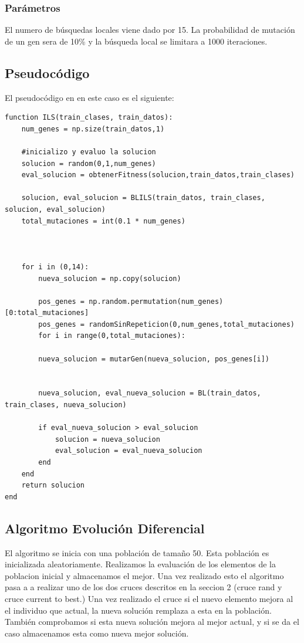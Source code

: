 \documentclass[titlepage]{article}
\begin{document}
	\subsubsection{Parámetros}
	El numero de búsquedas locales viene dado por 15. La probabilidad de mutación de un gen sera de 10\% y la búsqueda local se limitara a 1000 iteraciones.
	
	\subsection{Pseudocódigo}
	El pseudocódigo en en este caso es el siguiente:
	
	\begin{lstlisting}
function ILS(train_clases, train_datos):
	num_genes = np.size(train_datos,1)
	
	#inicializo y evaluo la solucion
	solucion = random(0,1,num_genes)   
	eval_solucion = obtenerFitness(solucion,train_datos,train_clases)
	
	solucion, eval_solucion = BLILS(train_datos, train_clases, solucion, eval_solucion)
	total_mutaciones = int(0.1 * num_genes)
	
	
	
	for i in (0,14):
		nueva_solucion = np.copy(solucion)
		
		pos_genes = np.random.permutation(num_genes)[0:total_mutaciones]
		pos_genes = randomSinRepeticion(0,num_genes,total_mutaciones)
		for i in range(0,total_mutaciones):
		
		nueva_solucion = mutarGen(nueva_solucion, pos_genes[i])
		
		
		nueva_solucion, eval_nueva_solucion = BL(train_datos, train_clases, nueva_solucion)
		
		if eval_nueva_solucion > eval_solucion
			solucion = nueva_solucion
			eval_solucion = eval_nueva_solucion
		end
	end
	return solucion
end
	\end{lstlisting}
	
	\subsection{Algoritmo Evolución Diferencial}
	El algoritmo se inicia con una  población de tamaño 50. Esta población es inicializada aleatoriamente. Realizamos la evaluación de los elementos de la poblacion inicial y almacenamos el mejor. Una vez realizado esto el algoritmo pasa a a realizar uno de los dos cruces descritos en la seccion 2 (cruce rand y cruce current to best.) Una vez realizado el cruce si el nuevo elemento mejora al el individuo que actual, la nueva solución remplaza a esta en la población. También  comprobamos si esta nueva solución mejora al mejor actual, y si se da el caso almacenamos esta como nueva mejor solución.
	
\end{document}
